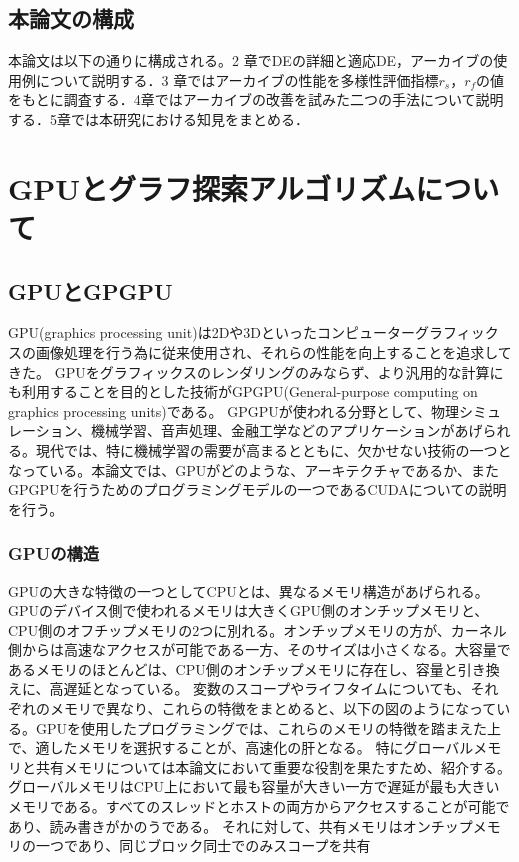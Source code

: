\documentclass[a4paper,11pt,oneside,openany]{jsbook}
\begin{document}
\section{本論文の構成}
本論文は以下の通りに構成される。2 章でDEの詳細と適応DE，アーカイブの使用例について説明する．3 章ではアーカイブの性能を多様性評価指標$r_s$，$r_f$の値をもとに調査する．4章ではアーカイブの改善を試みた二つの手法について説明する．5章では本研究における知見をまとめる．

\chapter{GPUとグラフ探索アルゴリズムについて}
\section{GPUとGPGPU}
GPU(graphics processing unit)は2Dや3Dといったコンピューターグラフィックスの画像処理を行う為に従来使用され、それらの性能を向上することを追求してきた。
GPUをグラフィックスのレンダリングのみならず、より汎用的な計算にも利用することを目的とした技術がGPGPU(General-purpose computing on graphics processing units)である。
GPGPUが使われる分野として、物理シミュレーション、機械学習、音声処理、金融工学などのアプリケーションがあげられる。現代では、特に機械学習の需要が高まるとともに、欠かせない技術の一つとなっている。本論文では、GPUがどのような、アーキテクチャであるか、またGPGPUを行うためのプログラミングモデルの一つであるCUDAについての説明を行う。


\subsection{GPUの構造}
GPUの大きな特徴の一つとしてCPUとは、異なるメモリ構造があげられる。GPUのデバイス側で使われるメモリは大きくGPU側のオンチップメモリと、CPU側のオフチップメモリの2つに別れる。オンチップメモリの方が、カーネル側からは高速なアクセスが可能である一方、そのサイズは小さくなる。大容量であるメモリのほとんどは、CPU側のオンチップメモリに存在し、容量と引き換えに、高遅延となっている。
変数のスコープやライフタイムについても、それぞれのメモリで異なり、これらの特徴をまとめると、以下の図のようになっている。GPUを使用したプログラミングでは、これらのメモリの特徴を踏まえた上で、適したメモリを選択することが、高速化の肝となる。
特にグローバルメモリと共有メモリについては本論文において重要な役割を果たすため、紹介する。
グローバルメモリはCPU上において最も容量が大きい一方で遅延が最も大きいメモリである。すべてのスレッドとホストの両方からアクセスすることが可能であり、読み書きがかのうである。
それに対して、共有メモリはオンチップメモリの一つであり、同じブロック同士でのみスコープを共有
\end{document}
